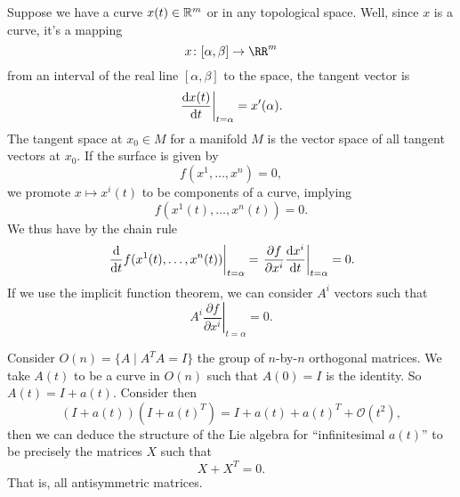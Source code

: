 Suppose we have a curve $x(t)\in\Bbb{R}^{m}$ or in any
topological space. Well, since $x$ is a curve, it's a mapping
\begin{equation}
x\colon[\alpha,\beta]\to\RR^{m}
\end{equation}
from an interval of the real line $[\alpha,\beta]$ to the space,
the tangent vector is
\begin{equation}
\left.\frac{\mathrm{d} x(t)}{\mathrm{d} t}\right|_{t=\alpha}=x'(\alpha).
\end{equation}
The tangent space at $x_{0}\in M$ for a manifold $M$ is the
vector space of all tangent vectors at $x_{0}$. If the surface is
given by
\begin{equation}
f(x^1,\dots,x^n)=0,
\end{equation}
we promote $x\mapsto x^{i}(t)$ to be components of a curve,
implying
\begin{equation}
f(x^{1}(t),\dots,x^{n}(t))=0.
\end{equation}
We thus have by the chain rule
\begin{equation}
\left.\frac{\mathrm{d} }{\mathrm{d} t}f(x^{1}(t),\dots,x^{n}(t))\right|_{t=\alpha}=\left.\frac{\partial
  f}{\partial x^i}\frac{\mathrm{d} x^i}{\mathrm{d} t}\right|_{t=\alpha}=0.
\end{equation}
If we use the implicit function theorem, we can consider $A^{i}$
vectors such that
\begin{equation}
\left.A^{i}\frac{\partial f}{\partial x^{i}}\right|_{t=\alpha}=0.
\end{equation}

\begin{ex}
Consider $O(n)=\{A\mid A^{T}A=I\}$ the group of $n$-by-$n$
orthogonal matrices. We take $A(t)$ to be a curve in $O(n)$ such
that $A(0)=I$ is the identity. So $A(t)=I+a(t)$. Consider then
\begin{equation}
(I+a(t))(I+a(t)^{T})=I+a(t)+a(t)^{T}+\mathcal{O}(t^{2}),
\end{equation}
then we can deduce the structure of the Lie algebra for
``infinitesimal $a(t)$'' to be precisely the matrices $X$ such
that
\begin{equation}
X+X^{T}=0.
\end{equation}
That is, all antisymmetric matrices.
\end{ex}


